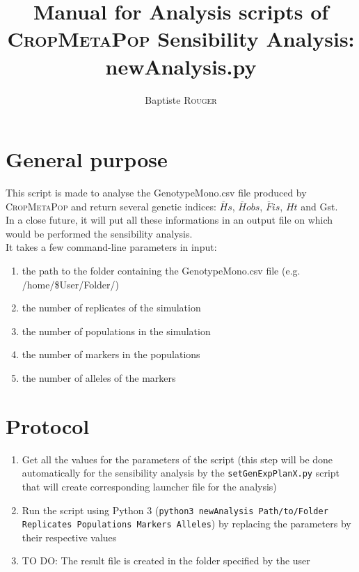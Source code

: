 \documentclass[10pt,a4paper]{article}
\title{Manual for Analysis scripts of \textsc{CropMetaPop} Sensibility Analysis:\\ \textbf{newAnalysis.py}}
\author{Baptiste \textsc{Rouger}}
\begin{document}
\maketitle
\section{General purpose}
This script is made to analyse the GenotypeMono.csv file produced by \textsc{CropMetaPop} and return several genetic indices: $\overline{H}s$, $\overline{H}obs$, $\overline{F}is$, $Ht$ and Gst.\\
In a close future, it will put all these informations in an output file on which would be performed the sensibility analysis.\\

It takes a few command-line parameters in input:
\begin{enumerate}
    \item the path to the folder containing the GenotypeMono.csv file (e.g. /home/\$User/Folder/)
    \item the number of replicates of the simulation
    \item the number of populations in the simulation
    \item the number of markers in the populations
    \item the number of alleles of the markers

\end{enumerate}
\section{Protocol}
\begin{enumerate}
        \item Get all the values for the parameters of the script (this step will be done automatically for the sensibility analysis by the \texttt{setGenExpPlanX.py} script that will create corresponding launcher file for the analysis)
        \item Run the script using Python 3 (\texttt{python3 newAnalysis Path/to/Folder Replicates Populations Markers Alleles}) by replacing the parameters by their respective values
        \item TO DO: The result file is created in the folder specified by the user
\end{enumerate}
\end{document}

